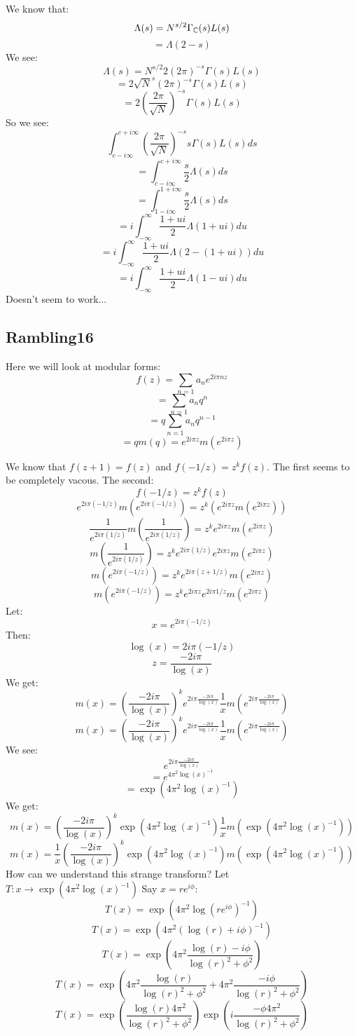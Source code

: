 \documentclass[a4paper]{amsart}
\begin{document}
We know that:
$$\Lambda(s) = N^{s/2} \Gamma_{\mathbb{C}}(s) L(s)$$
$$ = \Lambda(2 - s)$$
We see: 
$$\Lambda(s) = N^{s/2} 2 (2\pi)^{-s} \Gamma(s) L(s)$$
$$ = 2 \sqrt{N}^{s} (2\pi)^{-s} \Gamma(s) L(s)$$
$$ = 2 \left(\frac{2\pi}{\sqrt{N}}\right)^{-s} \Gamma(s) L(s)$$
So we see:
$$\int_{c - i\infty}^{c + i\infty}\left(\frac{2\pi}{\sqrt{N}}\right)^{-s}s\Gamma(s)L(s)ds$$
$$ = \int_{c - i\infty}^{c + i\infty}\frac{s}{2} \Lambda(s)ds$$
$$ = \int_{1 - i\infty}^{1 + i\infty}\frac{s}{2} \Lambda(s)ds$$
$$ = i \int_{-\infty}^{\infty}\frac{1 + ui}{2} \Lambda(1 + ui)du$$
$$ = i \int_{-\infty}^{\infty}\frac{1 + ui}{2} \Lambda(2 - (1 + ui))du$$
$$ = i \int_{-\infty}^{\infty}\frac{1 + ui}{2} \Lambda(1 - ui)du$$
Doesn't seem to work...
\subsection{Rambling16}
Here we will look at modular forms:
$$f(z) = \sum_{n = 1} a_n e^{2i\pi nz}$$
$$ = \sum_{n = 1} a_n q^n$$
$$ = q \sum_{n = 1} a_n q^{n - 1}$$
$$ = q m(q) = e^{2i\pi z} m(e^{2i\pi z})$$

We know that $f(z + 1) = f(z)$ and $f(-1/z) = z^kf(z)$. The first seems to be completely vacous. The second:
$$f(-1/z) = z^kf(z)$$
$$e^{2i\pi (-1/z)} m\left(e^{2i\pi (-1/z)}\right) = z^k(e^{2i\pi z} m(e^{2i\pi z}))$$
$$\frac{1}{e^{2i\pi (1/z)}} m\left(\frac{1}{e^{2i\pi (1/z)}}\right) = z^k e^{2i\pi z} m(e^{2i\pi z})$$
$$m\left(\frac{1}{e^{2i\pi (1/z)}}\right) = z^k e^{2i\pi (1/z)} e^{2i\pi z} m(e^{2i\pi z})$$
$$m\left(e^{2i\pi (-1/z)}\right) = z^k e^{2i\pi (z + 1/z)} m(e^{2i\pi z})$$
$$m\left(e^{2i\pi (-1/z)}\right) = z^k e^{2i\pi z} e^{2i\pi 1/z} m(e^{2i\pi z})$$
Let:
$$x = e^{2i\pi (-1/z)}$$
Then:
$$\log(x) = 2i\pi (-1/z)$$
$$z = \frac{-2i\pi}{\log(x)}$$
We get:
$$m(x) = \left(\frac{-2i\pi}{\log(x)}\right)^k e^{2i\pi \frac{-2i\pi}{\log(x)}} \frac{1}{x} m\left(e^{2i\pi \frac{-2i\pi}{\log(x)}}\right)$$
$$m(x) = \left(\frac{-2i\pi}{\log(x)}\right)^k e^{2i\pi \frac{-2i\pi}{\log(x)}} \frac{1}{x} m\left(e^{2i\pi \frac{-2i\pi}{\log(x)}}\right)$$
We see:
$$e^{2i\pi \frac{-2i\pi}{\log(x)}}$$
$$ = e^{4\pi^2 \log(x)^{-1}}$$
$$ = \exp(4\pi^2 \log(x)^{-1})$$
We get:
$$m(x) = \left(\frac{-2i\pi}{\log(x)}\right)^k \exp(4\pi^2 \log(x)^{-1}) \frac{1}{x} m\left(\exp(4\pi^2 \log(x)^{-1})\right)$$
$$m(x) = \frac{1}{x} \left(\frac{-2i\pi}{\log(x)}\right)^k \exp(4\pi^2 \log(x)^{-1}) m\left(\exp(4\pi^2 \log(x)^{-1})\right)$$
How can we understand this strange transform?
Let $T : x \to \exp(4\pi^2 \log(x)^{-1})$
Say $x = re^{i\phi}$:
$$T(x) = \exp(4\pi^2 \log(re^{i\phi})^{-1})$$
$$T(x) = \exp(4\pi^2 (\log(r) + i\phi)^{-1})$$
$$T(x) = \exp(4\pi^2 \frac{\log(r) - i\phi}{\log(r)^2 + \phi^2})$$
$$T(x) = \exp(4\pi^2 \frac{\log(r)}{\log(r)^2 + \phi^2} + 4\pi^2 \frac{-i\phi}{\log(r)^2 + \phi^2})$$
$$T(x) = \exp(\frac{\log(r)4\pi^2}{\log(r)^2 + \phi^2}) \exp(i\frac{-\phi4\pi^2}{\log(r)^2 + \phi^2})$$
\end{document}
